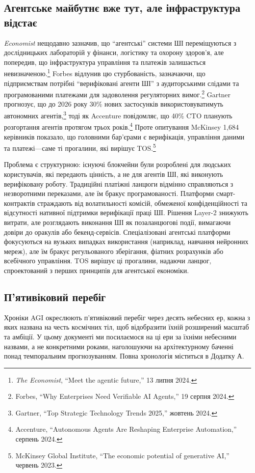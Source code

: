 \documentclass[11pt]{article}
\begin{document}
\subsection{Агентське майбутнє вже тут, але інфраструктура відстає}
\emph{Economist} нещодавно зазначив, що ``агентські'' системи ШІ переміщуються з дослідницьких лабораторій у фінанси, логістику та охорону здоров'я, але попередив, що інфраструктура управління та платежів залишається невизначеною.\footnote{\emph{The Economist}, ``Meet the agentic future,'' 13 липня 2024.} Forbes відлунив цю стурбованість, зазначаючи, що підприємствам потрібні ``верифіковані агенти ШІ'' з аудиторськими слідами та програмованими платежами для задоволення регуляторних вимог.\footnote{Forbes, ``Why Enterprises Need Verifiable AI Agents,'' 19 серпня 2024.} Gartner прогнозує, що до 2026 року 30\% нових застосунків використовуватимуть автономних агентів,\footnote{Gartner, ``Top Strategic Technology Trends 2025,'' жовтень 2024.} тоді як Accenture повідомляє, що 40\% CTO планують розгортання агентів протягом трьох років.\footnote{Accenture, ``Autonomous Agents Are Reshaping Enterprise Automation,'' серпень 2024.} Проте опитування McKinsey 1,684 керівників показало, що головними бар'єрами є верифікація, управління даними та платежі---саме ті прогалини, які вирішує TOS.\footnote{McKinsey Global Institute, ``The economic potential of generative AI,'' червень 2023.}

Проблема є структурною: існуючі блокчейни були розроблені для людських користувачів, які передають цінність, а не для агентів ШІ, які виконують верифіковану роботу. Традиційні платіжні ланцюги відмінно справляються з незворотними переказами, але їм бракує програмованості. Платформи смарт-контрактів страждають від волатильності комісій, обмеженої конфіденційності та відсутності нативної підтримки верифікації праці ШІ. Рішення Layer-2 знижують витрати, але розглядають виконання ШІ як позаланцюгові події, вимагаючи довіри до оракулів або бекенд-сервісів. Спеціалізовані агентські платформи фокусуються на вузьких випадках використання (наприклад, навчання нейронних мереж), але їм бракує регульованого зберігання, фіатних розрахунків або всебічного управління. TOS вирішує ці прогалини, надаючи ланцюг, спроектований з перших принципів для агентської економіки.

\subsection{П'ятивіковий перебіг}
Хроніки AGI окреслюють п'ятивіковий перебіг через десять небесних ер, кожна з яких названа на честь космічних тіл, щоб відобразити їхній розширений масштаб та амбіції. У цьому документі ми посилаємося на ці ери за їхніми небесними назвами, а не конкретними роками, наголошуючи на архітектурному баченні понад темпоральним прогнозуванням. Повна хронологія міститься в Додатку А.
\end{document}
